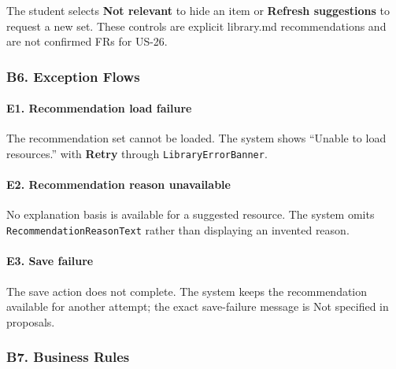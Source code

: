 \documentclass[12pt]{article}
\begin{document}
The student selects \textbf{Not relevant} to hide an item or \textbf{Refresh suggestions} to request a new set. These controls are explicit library.md recommendations and are not confirmed FRs for US-26.
\par\medskip

\hypertarget{sec:b6-exception-flows}{}
\subsubsection*{B6. Exception Flows}
\par\medskip

\hypertarget{sec:e1-recommendation-load-failure}{}
\paragraph*{E1. Recommendation load failure}
\par\medskip

The recommendation set cannot be loaded. The system shows “Unable to load resources.” with \textbf{Retry} through \texttt{LibraryErrorBanner}.
\par\medskip

\hypertarget{sec:e2-recommendation-reason-unavailable}{}
\paragraph*{E2. Recommendation reason unavailable}
\par\medskip

No explanation basis is available for a suggested resource. The system omits \texttt{RecommendationReasonText} rather than displaying an invented reason.
\par\medskip

\hypertarget{sec:e3-save-failure}{}
\paragraph*{E3. Save failure}
\par\medskip

The save action does not complete. The system keeps the recommendation available for another attempt; the exact save-failure message is Not specified in proposals.
\par\medskip

\hypertarget{sec:b7-business-rules}{}
\subsubsection*{B7. Business Rules}
\par\medskip
\end{document}
